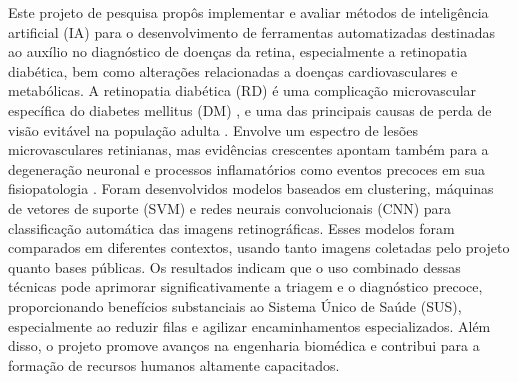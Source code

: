 Este projeto de pesquisa propôs implementar e avaliar métodos de inteligência artificial (IA) para o desenvolvimento de ferramentas automatizadas destinadas ao auxílio no diagnóstico de doenças da retina, especialmente a retinopatia diabética, bem como alterações relacionadas a doenças cardiovasculares e metabólicas. A retinopatia diabética (RD) é uma complicação microvascular específica do diabetes mellitus (DM) \cite{wong_diabetic_2016, wang_diabetic_2018}, e uma das principais causas de perda de visão evitável na população adulta \cite{wong_diabetic_2016, wang_diabetic_2018, melo_current_2018, korn_malerbi_feasibility_2022, teo_global_2021}. Envolve um espectro de lesões microvasculares retinianas, mas evidências crescentes apontam também para a degeneração neuronal e processos inflamatórios como eventos precoces em sua fisiopatologia \cite{wong_diabetic_2016, wang_diabetic_2018}. Foram desenvolvidos modelos baseados em clustering, máquinas de vetores de suporte (SVM) e redes neurais convolucionais (CNN) para classificação automática das imagens retinográficas. Esses modelos foram comparados em diferentes contextos, usando tanto imagens coletadas pelo projeto quanto bases públicas. Os resultados indicam que o uso combinado dessas técnicas pode aprimorar significativamente a triagem e o diagnóstico precoce, proporcionando benefícios substanciais ao Sistema Único de Saúde (SUS), especialmente ao reduzir filas e agilizar encaminhamentos especializados. Além disso, o projeto promove avanços na engenharia biomédica e contribui para a formação de recursos humanos altamente capacitados. \\